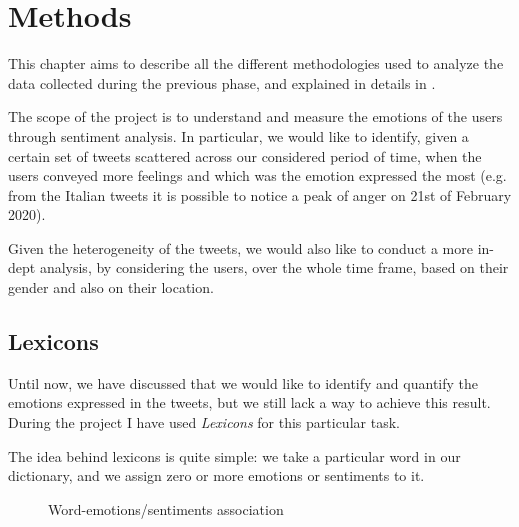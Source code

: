 \graphicspath{{chapters/chapter3/img/}}

\chapter{Methods}
\label{cha:methods}

This chapter aims to describe all the different methodologies used to analyze the data collected during the previous phase, and explained in details in . 

The scope of the project is to understand and measure the emotions of the users through sentiment analysis. In particular, we would like to identify, given a certain set of tweets scattered across our considered period of time, when the users conveyed more feelings and which was the emotion expressed the most (e.g. from the Italian tweets it is possible to notice a peak of anger on 21st of February 2020).

Given the heterogeneity of the tweets, we would also like to conduct a more in-dept analysis, by considering the users, over the whole time frame, based on their gender and also on their location.

\section{Lexicons}
\label{lexicons}

Until now, we have discussed that we would like to identify and quantify the emotions expressed in the tweets, but we still lack a way to achieve this result. During the project I have used \textit{Lexicons} for this particular task.

The idea behind lexicons is quite simple: we take a particular word in our dictionary, and we assign zero or more emotions or sentiments to it.
\begin{figure}[H]
	\centering
	\caption{Word-emotions/sentiments association}
	\label{fig:word-association}
\end{figure}

